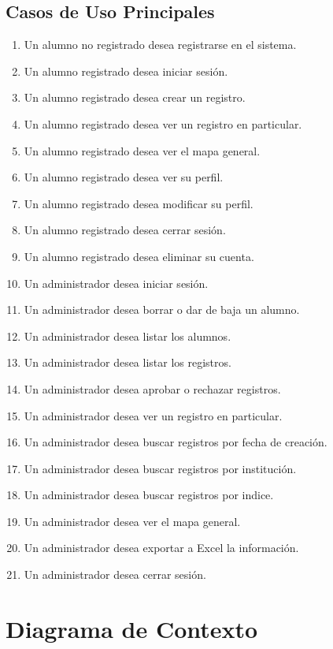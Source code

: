 \subsection{Casos de Uso Principales}

\begin{enumerate}[CU1: ]
    \itemsep-1em
    \item Un alumno no registrado desea registrarse en el sistema.
    \item Un alumno registrado desea iniciar sesión.
    \item Un alumno registrado desea crear un registro.
    \item Un alumno registrado desea ver un registro en particular.
    \item Un alumno registrado desea ver el mapa general.
    \item Un alumno registrado desea ver su perfil.
    \item Un alumno registrado desea modificar su perfil.
    \item Un alumno registrado desea cerrar sesión.
    \item Un alumno registrado desea eliminar su cuenta.
    \item Un administrador desea iniciar sesión.
    \item Un administrador desea borrar o dar de baja un alumno.
    \item Un administrador desea listar los alumnos.
    \item Un administrador desea listar los registros.
    \item Un administrador desea aprobar o rechazar registros.
    \item Un administrador desea ver un registro en particular.
    \item Un administrador desea buscar registros por fecha de creación.
    \item Un administrador desea buscar registros por institución.
    \item Un administrador desea buscar registros por indice.
    \item Un administrador desea ver el mapa general.
    \item Un administrador desea exportar a Excel la información.
    \item Un administrador desea cerrar sesión.
\end{enumerate}

\section{Diagrama de Contexto}

